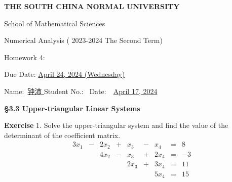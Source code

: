 \documentclass[UTF8,12pt,hyperref]{ctexart}
\makeatletter
\newenvironment{exercise}[1][{\color{blue}\bf Exercise}]%
{%
 \begin{center}   \begin{lrbox}{\@tempboxa}%
    \begin{minipage}{\textwidth}%
  {\color{blue}\bfseries
#1}   }{%
    \end{minipage}%
    \end{lrbox}
    \colorbox{green}{\noindent\usebox{\@tempboxa}} \end{center}  
}
\makeatother
\begin{document}

\begin{center}
{\bf  THE SOUTH CHINA NORMAL UNIVERSITY\vspace{0.08cm}

School of Mathematical Sciences\vspace{0.08cm}
 
Numerical Analysis ( 2023-2024 The Second Term) \vspace{0.18cm}

{\Large Homework 4: }\vspace{0.18cm}

Due Date: \underline{April  24, 2024 (Wednesday)} }
\end{center}\vspace{-0.16cm}

\begin{center}
  Name:\ \underline{\qquad 钟沛 \hspace{1cm}}\hspace{0.298cm}  
  Student No.:\ \underline{\hspace{1cm}} 
%
Date:\ \ \underline{April 17, 2024} 
 \end{center}
 
 

\begin{center}  \bf \Large
{\S 3.3 Upper-triangular Linear Systems }
\end{center} 
  
\begin{exercise}1.\quad   
Solve the upper-triangular system and find the value of the determinant of the coefficient matrix.
$$
\begin{array}{ccccccccr}
3x_1  & - & 2x_2 & + & x_3 & - & x_4 & = & 8 \\
  &   &  4x_2 & - & x_3 & + & 2x_4 & = & -3 \\
 & &   &  & 2x_3 & + & 3x_4 & = & 11  \\
  & &   &  &  &  & 5x_4 & = & 15  
\end{array}$$
\end{exercise}
\end{document}
